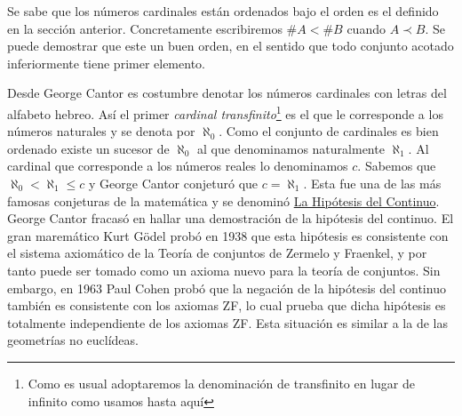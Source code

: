  Se sabe que los números cardinales están ordenados bajo el orden es el definido en la sección anterior.  Concretamente escribiremos   $\#A< \#B$ cuando $A\prec B$. Se puede demostrar que este un buen orden, en el sentido que todo conjunto acotado inferiormente tiene primer elemento. 
 
 Desde George Cantor es costumbre denotar los números cardinales con letras del alfabeto hebreo. Así el primer \emph{cardinal transfinito}\footnote{Como es usual adoptaremos la denominación de transfinito en lugar de infinito como usamos hasta aquí} es el que le corresponde a los números naturales y se denota por $\aleph_0$.
  Como el conjunto de cardinales es bien ordenado existe un sucesor de $\aleph_0$ al que denominamos naturalmente $\aleph_1$. Al cardinal que corresponde a los números reales lo denominamos $c$. Sabemos que $\aleph_0<\aleph_1\leq c$ y George Cantor  conjeturó
que $c=\aleph_1$. Esta fue una de las más famosas conjeturas de la matemática y se denominó \href{https://es.wikipedia.org/wiki/Hipótesis_del_continuo}{La Hipótesis del Continuo}. George Cantor fracasó en hallar una demostración de la hipótesis del continuo.   El gran maremático Kurt G\"odel probó en 1938 que esta hipótesis es consistente con el sistema axiomático de la Teoría de conjuntos de   Zermelo y Fraenkel, y por tanto puede ser tomado como un axioma nuevo para la teoría de conjuntos. Sin embargo, en 1963  Paul Cohen probó que la negación de la hipótesis del continuo también es consistente con los axiomas ZF, lo cual prueba que dicha hipótesis es totalmente independiente de los axiomas ZF. Esta situación es similar a la de las geometrías no euclídeas. 

